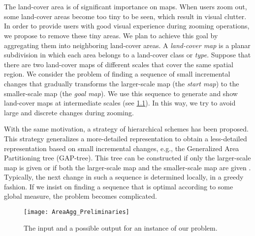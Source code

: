 \chapter[\AreaAggToCTitle]{\AreaAggTitle} 
\label{chap:AreaAgg}
\chaptermark{\AreaAggChapterMark}

The land-cover area is of significant importance on maps.
When users zoom out, some land-cover areas become
too tiny to be seen, which result in visual clutter.
In order to provide users 
with good visual experience during zooming operations,
we propose to remove these tiny areas.
We plan to achieve this goal by 
aggregating them into neighboring land-cover areas.
A \emph{land-cover map} is a planar subdivision in which 
each area belongs to a land-cover class or \emph{type}.
Suppose that there are two land-cover maps of different scales 
that cover the same spatial region.
We consider the problem of finding a sequence 
of small incremental changes that gradually transforms 
the larger-scale map (the \emph{start map}) to 
the smaller-scale map (the \emph{goal map}).
We use this sequence to generate and show land-cover maps at 
intermediate scales (see \fig\ref{fig:AreaAgg_example}).
In this way, we try to avoid large and discrete changes
during zooming.

With the same motivation, 
a strategy of hierarchical schemes has been proposed.
This strategy generalizes a more-detailed representation 
to obtain a less-detailed representation 
based on small incremental changes, 
e.g., the Generalized Area Partitioning tree (GAP-tree).
This tree can be constructed if only the larger-scale map is given
\citep{vanOosterom1995Development} 
or if both the larger-scale map and the smaller-scale map 
are given \citep{HaunertDilo2009}.
Typically, the next change in such a sequence 
is determined locally, in a greedy fashion.  
If we insist on finding a sequence that is optimal 
according to some global measure,
the problem becomes complicated.

\begin{figure}[tb]
\centering
\texttt{[image: AreaAgg\_Preliminaries]}
\caption{The input and a possible output for an instance of 
our problem.}
\label{fig:AreaAgg_example}
\end{figure}

